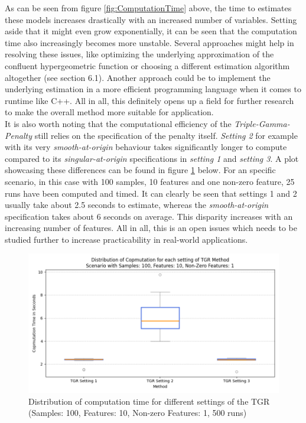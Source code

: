 \documentclass[12pt,a4paper]{article}
\begin{document}
As can be seen from figure \ref{fig:ComputationTime} above, the time to estimates these models increases drastically with an increased number of variables. Setting aside that it might even grow exponentially, it can be seen that the computation time also increasingly becomes more unstable. Several approaches might help in resolving these issues, like optimizing the underlying approximation of the confluent hypergeometric function or choosing a different estimation algorithm altogether (see section 6.1). Another approach could be to implement the underlying estimation in a more efficient programming language when it comes to runtime like C++. All in all, this definitely opens up a field for further research to make the overall method more suitable for application. \\


It is also worth noting that the computational efficiency of the \textit{Triple-Gamma-Penalty} still relies on the specification of the penalty itself. \textit{Setting 2} for example with its very \textit{smooth-at-origin} behaviour takes significantly longer to compute compared to its \textit{singular-at-origin} specifications in \textit{setting 1} and \textit{setting 3}. A plot showcasing these differences can be found in figure \ref{fig:ComputationTimeSettings} below. For an specific scenario, in this case with 100 samples, 10 features and one non-zero feature, 25 runs have been computed and timed. It can clearly be seen that settings 1 and 2 usually take about 2.5 seconds to estimate, whereas the \textit{smooth-at-origin} specification takes about 6 seconds on average. This disparity increases with an increasing number of features. All in all, this is an open issues which needs to be studied further to increase practicability in real-world applications. 

\begin{figure}[H]
\centering
\includegraphics[scale=0.6]{../02_simulation/021_simulation_figures/ComputationTime_Different_Settings.png}
\caption{Distribution of computation time for different settings of the TGR (Samples: 100, Features: 10, Non-zero Features: 1, 500 runs)}
\label{fig:ComputationTimeSettings}
\end{figure}
\end{document}
